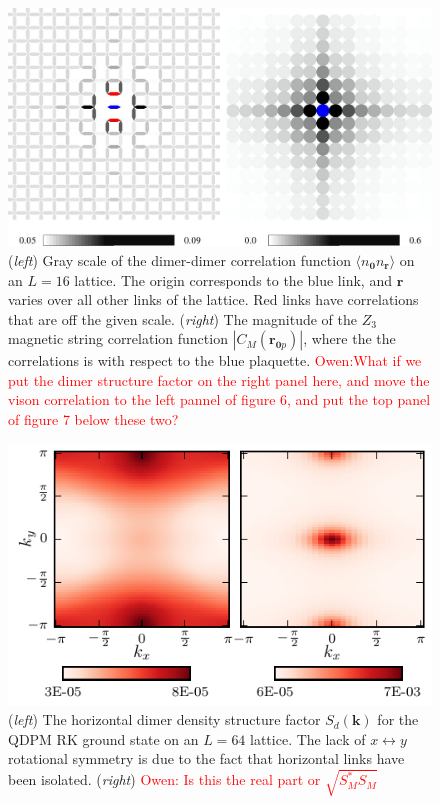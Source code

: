 \documentclass[twocolumn,prb,aps,floatfix,superscriptaddress]{revtex4-1}
\newcommand{\note}[1]{\textcolor{red}{#1}}
\begin{document}
    \begin{figure}[t]
        \centering
        \includegraphics[width=1.0\columnwidth]{dimer_gry_scale_qdpm.pdf}
        \caption{({\it left}) Gray scale of the dimer-dimer correlation function $\langle n_{\bm{0}} n_{\bm{r}}\rangle$ on an $L=16$ lattice. The origin corresponds to the blue link, and $\bm{r}$ varies over all other links of the lattice. Red links have correlations that are off the given scale. ({\it right}) The magnitude of the $Z_3$ magnetic string correlation function $|C_M(\bm{r}_{\bm{0}p})|$, where the the correlations is with respect to the blue plaquette. \note{Owen:What if we put the dimer structure factor on the right panel here, and move the vison correlation to the left pannel of figure 6, and put the top panel of figure 7 below these two?}}
        \label{fig:dimer_vison_heatmap}
    \end{figure}
   \begin{figure}[t]
        \centering
        \includegraphics[width=1.0\columnwidth]{qdpm_dmr_vis_HM.pdf}
        \caption{({\it left}) The horizontal dimer density structure factor $S_d(\bm{k})$ for the QDPM RK ground state on an $L=64$ lattice. The lack of $x\leftrightarrow y$ rotational symmetry is due to the fact that horizontal links have been isolated. ({\it right}) \note{Owen: Is this the real part or $\sqrt{S_M^* S_M}$}}
        \label{fig:structure_factor} 
    \end{figure}
\end{document}
